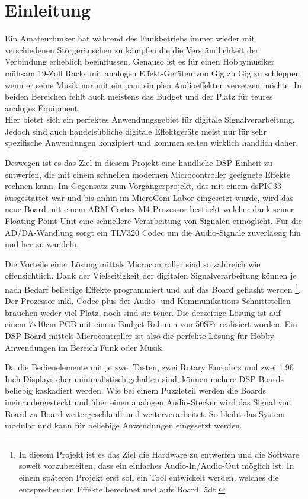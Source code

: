 \section{Einleitung}
\label{sec:Einleitung}

Ein Amateurfunker hat während des Funkbetriebs immer wieder mit verschiedenen Störgeräuschen zu kämpfen die die Verständlichkeit der Verbindung erheblich beeinflussen. Genauso ist es für einen Hobbymusiker mühsam 19-Zoll Racks mit analogen Effekt-Geräten von Gig zu Gig zu schleppen, wenn er seine Musik nur mit ein paar simplen Audioeffekten versetzen möchte. In beiden Bereichen fehlt auch meistens das Budget und der Platz für teures analoges Equipment.\\
Hier bietet sich ein perfektes Anwendungsgebiet für digitale Signalverarbeitung. Jedoch sind auch handelsübliche digitale Effektgeräte meist nur für sehr spezifische Anwendungen konzipiert und kommen selten wirklich handlich daher.

Deswegen ist es das Ziel in diesem Projekt eine handliche DSP Einheit zu entwerfen, die mit einem schnellen modernen Microcontroller geeignete Effekte rechnen kann. Im Gegensatz zum Vorgängerprojekt, das mit einem dsPIC33 ausgestattet war und bis anhin im MicroCom Labor eingesetzt wurde, wird das neue Board mit einem ARM Cortex M4 Prozessor bestückt welcher dank seiner Floating-Point-Unit eine schnellere Verarbeitung von Signalen ermöglicht. Für die AD/DA-Wandlung sorgt ein TLV320 Codec um die Audio-Signale zuverlässig hin und her zu wandeln.

Die Vorteile einer Lösung  mittels Microcontroller sind so zahlreich wie offensichtlich. Dank der Vielseitigkeit der digitalen Signalverarbeitung können je nach Bedarf beliebige Effekte programmiert und auf das Board geflasht werden \footnote{In diesem Projekt ist es das Ziel die Hardware zu entwerfen und die Software soweit vorzubereiten, dass ein einfaches Audio-In/Audio-Out möglich ist. In einem späteren Projekt erst soll ein Tool entwickelt werden, welches die entsprechenden Effekte berechnet und aufs Board lädt.}. Der Prozessor inkl. Codec plus der Audio- und Kommunikations-Schnittstellen brauchen weder viel Platz, noch sind sie teuer. Die derzeitige Lösung ist auf einem 7x10cm PCB mit einem Budget-Rahmen von 50SFr realisiert worden. Ein DSP-Board mittels Microcontroller ist also die perfekte Lösung für Hobby-Anwendungen im Bereich Funk oder Musik.

Da die Bedienelemente mit je zwei Tasten, zwei Rotary Encoders und zwei 1.96 Inch Displays eher minimalistisch gehalten sind, können mehere DSP-Boards beliebig kaskadiert werden. Wie bei einem Puzzleteil werden die Boards ineinandergesteckt und über einen analogen Audio-Stecker wird das Signal von Board zu Board weitergeschlauft und weiterverarbeitet. So bleibt das System modular und kann für beliebige Anwendungen eingesetzt werden.

